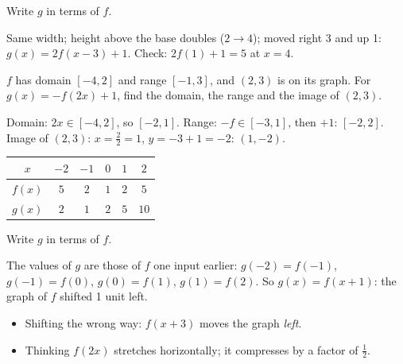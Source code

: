 \begin{center}
\end{center}
Write $g$ in terms of $f$.
\begin{workspace}[2.4cm]
Same width; height above the base doubles ($2\to4$); moved right 3 and up 1: $g(x)=2f(x-3)+1$. Check: $2f(1)+1=5$ at $x=4$.
\end{workspace}

$f$ has domain $[-4,2]$ and range $[-1,3]$, and $(2,3)$ is on its graph. For $g(x)=-f(2x)+1$, find the domain, the range and the image of $(2,3)$.
\begin{workspace}[2.6cm]
Domain: $2x\in[-4,2]$, so $[-2,1]$. Range: $-f\in[-3,1]$, then $+1$: $[-2,2]$.\\
Image of $(2,3)$: $x=\frac22=1$, $y=-3+1=-2$: $(1,-2)$.
\end{workspace}

\begin{center}\begin{tabular}{c|ccccc}$x$&$-2$&$-1$&$0$&$1$&$2$\\\hline$f(x)$&$5$&$2$&$1$&$2$&$5$\\$g(x)$&$2$&$1$&$2$&$5$&$10$\end{tabular}\end{center}
Write $g$ in terms of $f$.
\begin{workspace}[2cm]
The values of $g$ are those of $f$ one input earlier: $g(-2)=f(-1)$, $g(-1)=f(0)$, $g(0)=f(1)$, $g(1)=f(2)$. So $g(x)=f(x+1)$: the graph of $f$ shifted 1 unit left.
\end{workspace}

\begin{mistakes}
\begin{itemize}
\item Shifting the wrong way: $f(x+3)$ moves the graph \emph{left}.
\item Thinking $f(2x)$ stretches horizontally; it compresses by a factor of $\frac12$.
\end{itemize}
\end{mistakes}

